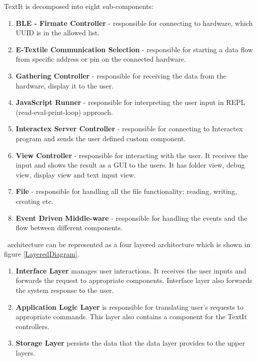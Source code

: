 

 TextIt is decomposed into eight sub-components:
\begin{enumerate}
\item \textbf{BLE - Firmate Controller} - responsible for connecting to hardware, which UUID is in the allowed list.
\item \textbf{E-Textile Communication Selection} - responsible for starting a data flow from specific address or pin on the connected hardware.
\item \textbf{Gathering Controller} - responsible for receiving the data from the hardware, display it to the user.
\item \textbf{JavaScript Runner} - responsible for interpreting the user input in REPL (read-eval-print-loop) approach. 
\item \textbf{Interactex Server Controller} - responsible for connecting to Interactex program and sends the user defined custom component.
\item \textbf{View Controller} - responsible for interacting with the user. It receives the input and shows the result as a GUI to the users. It has folder view, debug view, display view and text input view.
\item \textbf{File} - responsible for handling all the file functionality; reading, writing, creating etc.
\item \textbf{Event Driven Middle-ware} - responsible for handling the events and the flow between different components.

\end{enumerate}

\seif\ architecture can be represented as a four layered architecture which is shown in figure \ref{LayeredDiagram}. 


\begin{enumerate}
\item \textbf{Interface Layer} manages user interactions. It receives the user inputs and forwards the request to appropriate components. Interface layer also forwards the system response to the user.

\item \textbf{Application Logic Layer} is responsible for translating user's requests to appropriate commands. This layer also contains a component for the TextIt controllers.

\item \textbf{Storage Layer} persists the data that the data layer provides to the upper layers.

\end{enumerate}



